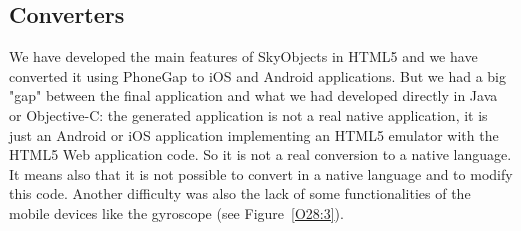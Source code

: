 \subsection{Converters}
We have developed the main features of SkyObjects in HTML5 and we have converted it using PhoneGap to iOS and Android applications. But we had a big "gap" between the final application and what we had developed directly in Java or Objective-C: the generated application is not a real native application, it is just an Android or iOS application implementing an HTML5 emulator with the HTML5 Web application code. So it is not a real conversion to a native language. It means also that it is not possible to convert in a native language and to modify this code. Another difficulty was also the lack of some functionalities of the mobile devices like the gyroscope  (see Figure~\ref{O28:3}).

